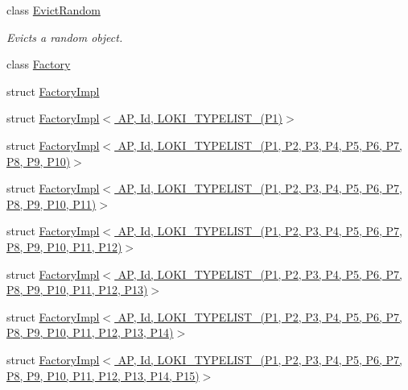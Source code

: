 \begin{DoxyCompactItemize}
class \hyperlink{classLoki_1_1EvictRandom}{Evict\+Random}
\begin{DoxyCompactList}\small\item\em Evicts a random object. \end{DoxyCompactList}\item 
class \hyperlink{classLoki_1_1Factory}{Factory}
\item 
struct \hyperlink{structLoki_1_1FactoryImpl}{Factory\+Impl}
\item 
struct \hyperlink{structLoki_1_1FactoryImpl_3_01AP_00_01Id_00_01LOKI__TYPELIST__1_07P1_08_4}{Factory\+Impl$<$ A\+P, Id, L\+O\+K\+I\+\_\+\+T\+Y\+P\+E\+L\+I\+S\+T\+\_(\+P1)$>$}
\item 
struct \hyperlink{structLoki_1_1FactoryImpl_3_01AP_00_01Id_00_01LOKI__TYPELIST__10_07P1_00_01P2_00_01P3_00_01P4_006bf86c8d65ea04f4e008765340803443}{Factory\+Impl$<$ A\+P, Id, L\+O\+K\+I\+\_\+\+T\+Y\+P\+E\+L\+I\+S\+T\+\_(\+P1, P2, P3, P4, P5, P6, P7, P8, P9, P10)$>$}
\item 
struct \hyperlink{structLoki_1_1FactoryImpl_3_01AP_00_01Id_00_01LOKI__TYPELIST__11_07P1_00_01P2_00_01P3_00_01P4_0057b58833803e40340e0ecec150a877a5}{Factory\+Impl$<$ A\+P, Id, L\+O\+K\+I\+\_\+\+T\+Y\+P\+E\+L\+I\+S\+T\+\_(\+P1, P2, P3, P4, P5, P6, P7, P8, P9, P10, P11)$>$}
\item 
struct \hyperlink{structLoki_1_1FactoryImpl_3_01AP_00_01Id_00_01LOKI__TYPELIST__12_07P1_00_01P2_00_01P3_00_01P4_00f13f17f8239845d239ca7a0cdddac4d0}{Factory\+Impl$<$ A\+P, Id, L\+O\+K\+I\+\_\+\+T\+Y\+P\+E\+L\+I\+S\+T\+\_(\+P1, P2, P3, P4, P5, P6, P7, P8, P9, P10, P11, P12)$>$}
\item 
struct \hyperlink{structLoki_1_1FactoryImpl_3_01AP_00_01Id_00_01LOKI__TYPELIST__13_07P1_00_01P2_00_01P3_00_01P4_00247c15bcbc98870388f2510cb34a203f}{Factory\+Impl$<$ A\+P, Id, L\+O\+K\+I\+\_\+\+T\+Y\+P\+E\+L\+I\+S\+T\+\_(\+P1, P2, P3, P4, P5, P6, P7, P8, P9, P10, P11, P12, P13)$>$}
\item 
struct \hyperlink{structLoki_1_1FactoryImpl_3_01AP_00_01Id_00_01LOKI__TYPELIST__14_07P1_00_01P2_00_01P3_00_01P4_00ffe9f7654c2917213926c996b21bf7a6}{Factory\+Impl$<$ A\+P, Id, L\+O\+K\+I\+\_\+\+T\+Y\+P\+E\+L\+I\+S\+T\+\_(\+P1, P2, P3, P4, P5, P6, P7, P8, P9, P10, P11, P12, P13, P14)$>$}
\item 
struct \hyperlink{structLoki_1_1FactoryImpl_3_01AP_00_01Id_00_01LOKI__TYPELIST__15_07P1_00_01P2_00_01P3_00_01P4_00409b4228cd5dfbe237d6d4489608665a}{Factory\+Impl$<$ A\+P, Id, L\+O\+K\+I\+\_\+\+T\+Y\+P\+E\+L\+I\+S\+T\+\_(\+P1, P2, P3, P4, P5, P6, P7, P8, P9, P10, P11, P12, P13, P14, P15)$>$}

\end{DoxyCompactItemize}
